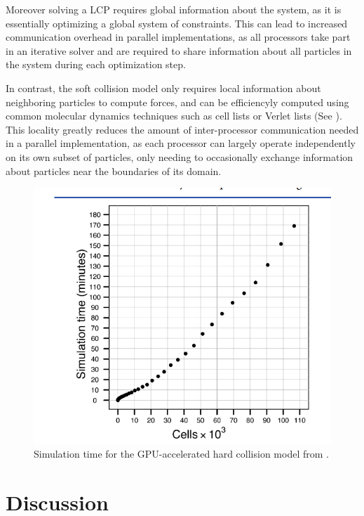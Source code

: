 \documentclass[conference]{IEEEtran}
\begin{document}
Moreover solving a LCP requires global information about the system, as it is essentially optimizing a global system of constraints. This can lead to increased communication overhead in parallel implementations, as all processors take part in an iterative solver and are required to share information about all particles in the system during each optimization step.


In contrast, the soft collision model only requires local information about neighboring particles to compute forces, and can be efficiencyly computed using common molecular dynamics techniques such as cell lists or Verlet lists (See \cite{Gratl2019}). This locality greatly reduces the amount of inter-processor communication needed in a parallel implementation, as each processor can largely operate independently on its own subset of particles, only needing to occasionally exchange information about particles near the boundaries of its domain.





\begin{figure}
    \centering
    \includegraphics[width=\linewidth]{figures/rudge.png}
    \caption{Simulation time for the GPU-accelerated hard collision model from \cite{Rudge2012}.}
    \label{figure:rudge_performance}
\end{figure}

\newpage
\section{Discussion}
\end{document}
